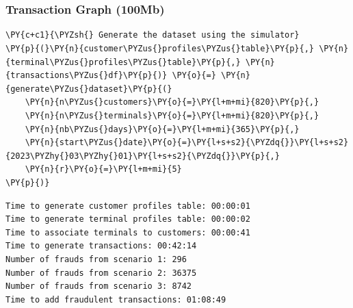     
    \begin{center}
    \end{center}
    { \hspace*{\fill} \\}
    
    \begin{center}
    \end{center}
    { \hspace*{\fill} \\}
    
    \hypertarget{transaction-graph-100mb}{%
\subsubsection{Transaction Graph
(100Mb)}\label{transaction-graph-100mb}}

    \begin{tcolorbox}[breakable, size=fbox, boxrule=1pt, pad at break*=1mm,colback=cellbackground, colframe=cellborder]
\begin{Verbatim}[commandchars=\\\{\}]
\PY{c+c1}{\PYZsh{} Generate the dataset using the simulator}
\PY{p}{(}\PY{n}{customer\PYZus{}profiles\PYZus{}table}\PY{p}{,} \PY{n}{terminal\PYZus{}profiles\PYZus{}table}\PY{p}{,} \PY{n}{transactions\PYZus{}df}\PY{p}{)} \PY{o}{=} \PY{n}{generate\PYZus{}dataset}\PY{p}{(}
    \PY{n}{n\PYZus{}customers}\PY{o}{=}\PY{l+m+mi}{820}\PY{p}{,}
    \PY{n}{n\PYZus{}terminals}\PY{o}{=}\PY{l+m+mi}{820}\PY{p}{,}
    \PY{n}{nb\PYZus{}days}\PY{o}{=}\PY{l+m+mi}{365}\PY{p}{,}
    \PY{n}{start\PYZus{}date}\PY{o}{=}\PY{l+s+s2}{\PYZdq{}}\PY{l+s+s2}{2023\PYZhy{}03\PYZhy{}01}\PY{l+s+s2}{\PYZdq{}}\PY{p}{,}
    \PY{n}{r}\PY{o}{=}\PY{l+m+mi}{5}
\PY{p}{)}
\end{Verbatim}
\end{tcolorbox}

    \begin{Verbatim}[commandchars=\\\{\}]
Time to generate customer profiles table: 00:00:01
Time to generate terminal profiles table: 00:00:02
Time to associate terminals to customers: 00:00:41
Time to generate transactions: 00:42:14
Number of frauds from scenario 1: 296
Number of frauds from scenario 2: 36375
Number of frauds from scenario 3: 8742
Time to add fraudulent transactions: 01:08:49
    \end{Verbatim}

